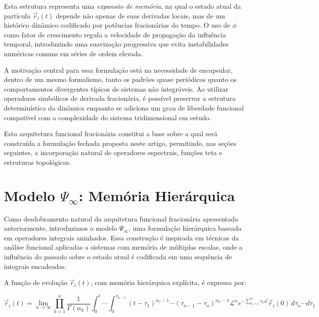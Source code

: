 \documentclass[12pt]{article}
\begin{document}
Esta estrutura representa uma \textit{expansão de memória}, na qual o estado atual da partícula \( \vec{r}_i(t) \) depende não apenas de suas derivadas locais, mas de um histórico dinâmico codificado por potências fracionárias do tempo. O uso de \( \phi \) como fator de crescimento regula a velocidade de propagação da influência temporal, introduzindo uma suavização progressiva que evita instabilidades numéricas comuns em séries de ordem elevada.

A motivação central para essa formulação está na necessidade de encapsular, dentro de um mesmo formalismo, tanto os padrões quase periódicos quanto os comportamentos divergentes típicos de sistemas não integráveis. Ao utilizar operadores simbólicos de derivada fracionária, é possível preservar a estrutura determinística da dinâmica enquanto se adiciona um grau de liberdade funcional compatível com a complexidade do sistema tridimensional em estudo.

Esta arquitetura funcional fracionária constitui a base sobre a qual será construída a formulação fechada proposta neste artigo, permitindo, nas seções seguintes, a incorporação natural de operadores espectrais, funções teta e estruturas topológicas.

\section{Modelo \texorpdfstring{$\Psi_\infty$}{Psi-infinito}: Memória Hierárquica}

Como desdobramento natural da arquitetura funcional fracionária apresentada anteriormente, introduzimos o modelo \(\Psi_\infty\), uma formulação hierárquica baseada em operadores integrais aninhados. Essa construção é inspirada em técnicas da análise funcional aplicadas a sistemas com memória de múltiplas escalas, onde a influência do passado sobre o estado atual é codificada em uma sequência de integrais encadeadas.

A função de evolução \(\vec{r}_i(t)\), com memória hierárquica explícita, é expressa por:

\[
\vec{r}_i(t) = \lim_{n \to \infty} \prod_{k=1}^n \frac{1}{\Gamma(\alpha_k)} \int_0^t \cdots \int_0^{\tau_{n-1}} (t - \tau_1)^{\alpha_1 - 1} \cdots (\tau_{n-1} - \tau_n)^{\alpha_n - 1} \mathcal{L}^n e^{-\sum_{k=1}^{n} \tau_k \mathcal{L}} \vec{r}_i(0) \, d\tau_n \cdots d\tau_1
\]
\end{document}
